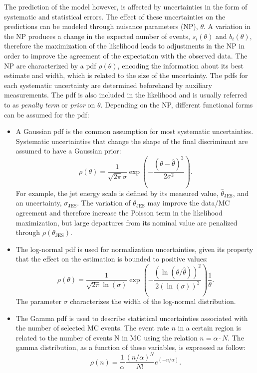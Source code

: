     The prediction of the model however, is affected by uncertainties in the form of systematic and statistical errors. The effect of these uncertainties on the predictions can be modeled through nuisance parameters (NP), $\theta$. A variation in the NP produces a change in the expected number of events, $s_i(\theta)$ and $b_i(\theta)$, therefore the maximization of the likelihood leads to adjustments in the NP in order to improve the agreement of the expectation with the observed data. 
    The NP are characterized by a pdf $\rho(\theta)$, encoding the information about its best estimate and width, which is related to the size of the uncertainty. The pdfs for each systematic uncertainty are determined beforehand by auxiliary measurements. The pdf is also included in the likelihood and is usually referred to as \textit{penalty term} or \textit{prior} on $\theta$. Depending on the NP, different functional forms can be assumed for the pdf:
    \begin{itemize}
    \item A Gaussian pdf is the common assumption for most systematic uncertainties. 
      Systematic uncertainties that change the shape of the final discriminant are assumed to have a Gaussian prior:
      \begin{equation}
        \label{eq:NPGaus}
        \rho (\theta)= \frac{1}{\sqrt{2\pi}\sigma}\exp\left(-\frac{(\theta-\hat{\theta})^2}{2\sigma^2}\right).
      \end{equation}
      For example, the jet energy scale is defined by its measured value, $\hat{\theta}_{\mathrm{JES}}$, and an uncertainty, $\sigma_{\mathrm{JES}}$. The variation of $\theta_{\mathrm{JES}}$ may improve the data/MC agreement and therefore increase the Poisson term in the likelihood maximization, but large departures from its nominal value are penalized through $\rho (\theta_{\mathrm{JES}})$.
    \item The log-normal pdf is used for normalization uncertainties, given its property that the effect on the estimation is bounded to positive values:
      \begin{equation}
        \label{eq:NPLogNormal}
        \rho (\theta) = \frac{1}{\sqrt{2\pi}\ln (\sigma)}\exp \left(- \frac{(\ln(\theta/\hat{\theta}))^2}{2(\ln(\sigma))^2}\right)\frac{1}{\theta}.
      \end{equation}
      The parameter $\sigma $ characterizes the width of the log-normal distribution.
    \item The Gamma pdf is used to describe statistical uncertainties associated with the number of 
      selected MC events. The event rate $n$ in a certain region is related to the number
      of events N in MC using the relation $n=\alpha\cdot N$. The gamma distribution, as a function of these 
      variables, is expressed as follow:
      \begin{equation}
        \label{eq:NPGamma}
        \rho (n) = \frac{1}{\alpha}\frac{(n/\alpha)^N}{N!}e^{\left(-n/\alpha \right)}.
      \end{equation}
    \end{itemize}
